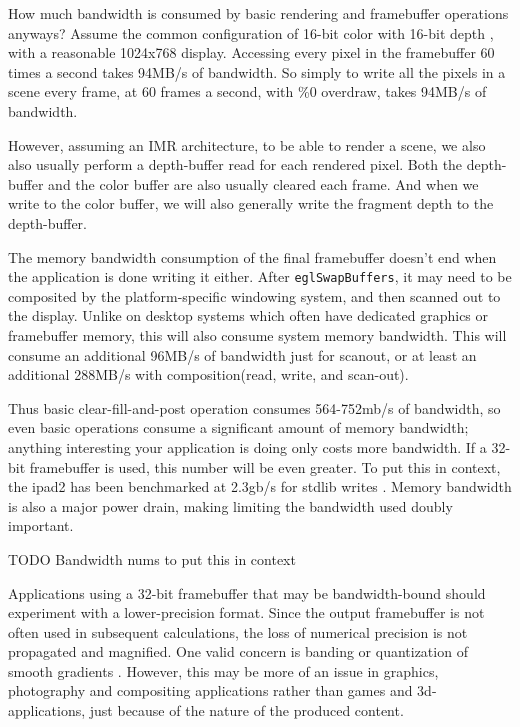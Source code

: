 How much bandwidth is consumed by basic rendering and framebuffer operations anyways?  Assume the common configuration of 16-bit color with 16-bit depth \cite{GLSurfaceView}, with a reasonable 1024x768 display.  Accessing every pixel in the framebuffer 60 times a second takes 94MB/s of bandwidth.  So simply to write all the pixels in a scene every frame, at 60 frames a second, with \%0 overdraw, takes 94MB/s of bandwidth.

 

However, assuming an IMR architecture, to be able to render a scene, we also also usually perform a depth-buffer read for each rendered pixel.  Both the depth-buffer and the color buffer are also usually cleared each frame.  And when we write to the color buffer, we will also generally write the fragment depth to the depth-buffer.

The memory bandwidth consumption of the final framebuffer doesn't end when the application is done writing it either.  After \texttt{eglSwapBuffers}, it may need to be composited by the platform-specific windowing system, and then scanned out to the display.  Unlike on desktop systems which often have dedicated graphics or framebuffer memory, this will also consume system memory bandwidth.  This will consume an additional 96MB/s of bandwidth just for scanout, or at least an additional 288MB/s with composition(read, write, and scan-out).


Thus basic clear-fill-and-post operation consumes 564-752mb/s of bandwidth, so
even basic operations consume a significant amount of memory bandwidth;
anything interesting your application is doing only costs more bandwidth.  If a
32-bit framebuffer is used, this number will be even greater.  To put this in
context, the ipad2 has been benchmarked at 2.3gb/s for stdlib writes
\cite{anandtech_ipad2}.  Memory bandwidth is also a major power drain, making
limiting the bandwidth used doubly important.

TODO Bandwidth nums to put this in context


Applications using a 32-bit framebuffer that may be bandwidth-bound should experiment with a lower-precision format.  Since the output framebuffer is not often used in subsequent calculations, the loss of numerical precision is not propagated and magnified.  One valid concern is banding or quantization of smooth gradients \cite{32_bit_windows}.  However, this may be more of an issue in graphics, photography and compositing applications rather than games and 3d-applications, just because of the nature of the produced content.

